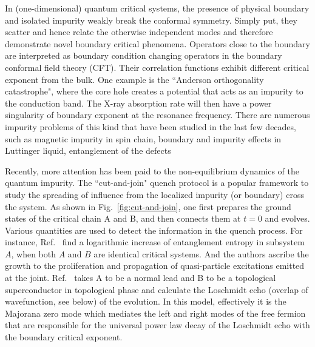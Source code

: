 

In (one-dimensional) quantum critical systems, the presence of physical boundary and isolated impurity weakly break the conformal symmetry. Simply put, they scatter and hence relate the otherwise independent modes and therefore demonstrate novel boundary critical phenomena\cite{cardy_boundary_2004}. Operators close to the boundary are interpreted as boundary condition changing operators\cite{oshikawa_boundary_1997,affleck_boundary_1997} in the boundary conformal field theory (CFT). Their correlation functions exhibit different critical exponent from the bulk\cite{cardy_conformal_1984}. One example is the ``Anderson orthogonality catastrophe", where the core hole creates a potential that acts as an impurity to the conduction band. The X-ray absorption rate will then have a power singularity of boundary exponent\cite{affleck_boundary_1997} at the resonance frequency. There are numerous impurity problems of this kind that have been studied in the last few decades, such as magnetic impurity in spin chain\cite{eggert_magnetic_1992}, boundary and impurity effects in Luttinger liquid\cite{fabrizio_interacting_1995}, entanglement of the defects\cite{peschel_entanglement_2005, igloi_entanglement_2009,calabrese_entanglement_2012} \etc

Recently, more attention has been paid to the non-equilibrium dynamics of the quantum impurity. The ``cut-and-join" quench protocol is a popular framework to study the spreading of influence from the localized impurity (or boundary) cross the system. As shown in Fig.~\ref{fig:cut-and-join}, one first prepares the ground states of the critical chain A and B, and then connects them at $t = 0$ and evolves. Various quantities are used to detect the information in the quench process. For instance, Ref.~ find a logarithmic increase of entanglement entropy in subsystem $A$, when both $A$ and $B$ are identical critical systems. And the authors ascribe the growth to the proliferation and propagation of quasi-particle excitations emitted at the joint. Ref.~ takes A to be a normal lead and B to be a topological superconductor in topological phase and calculate the Loschmidt echo (overlap of wavefunction, see below) of the evolution. In this model, effectively it is the Majorana zero mode which mediates the left and right modes of the free fermion that are responsible for the universal power law decay of the Loschmidt echo with the boundary critical exponent. 

